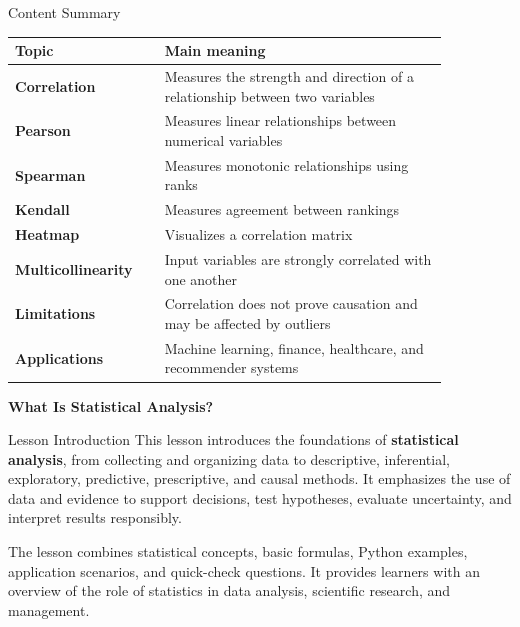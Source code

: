 \documentclass[aspectratio=169,11pt]{beamer}
\begin{document}
\begin{frame}[allowframebreaks]{Content Summary}
\small
\begin{center}\scriptsize
\begin{tabular}{@{}p{0.28\linewidth}p{0.58\linewidth}@{}}
\toprule
\textbf{Topic} & \textbf{Main meaning}\\
\midrule
\textbf{Correlation} & Measures the strength and direction of a relationship between two variables\\
\textbf{Pearson} & Measures linear relationships between numerical variables\\
\textbf{Spearman} & Measures monotonic relationships using ranks\\
\textbf{Kendall} & Measures agreement between rankings\\
\textbf{Heatmap} & Visualizes a correlation matrix\\
\textbf{Multicollinearity} & Input variables are strongly correlated with one another\\
\textbf{Limitations} & Correlation does not prove causation and may be affected by outliers\\
\textbf{Applications} & Machine learning, finance, healthcare, and recommender systems\\
\bottomrule
\end{tabular}
\end{center}
\end{frame}
\begin{frame}
\centering\vfill
{\Huge\textcolor{TitleBlue}{\textbf{What Is Statistical Analysis?}}}
\vfill\end{frame}
\begin{frame}[allowframebreaks]{Lesson Introduction}
\small
This lesson introduces the foundations of \textbf{statistical analysis}, from collecting and organizing data to descriptive, inferential, exploratory, predictive, prescriptive, and causal methods. It emphasizes the use of data and evidence to support decisions, test hypotheses, evaluate uncertainty, and interpret results responsibly.\par\medskip
The lesson combines statistical concepts, basic formulas, Python examples, application scenarios, and quick-check questions. It provides learners with an overview of the role of statistics in data analysis, scientific research, and management.\par\medskip
\end{frame}
\end{document}
